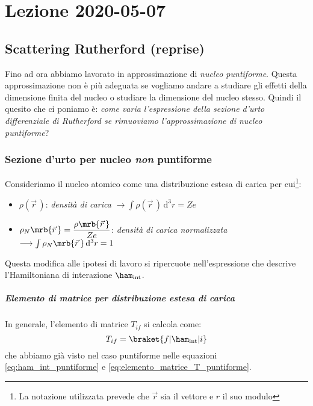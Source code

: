 \chapter{Lezione 2020-05-07}
\section{Scattering Rutherford (reprise)}
Fino ad ora abbiamo lavorato in approssimazione di \textit{nucleo puntiforme}.
Questa approssimazione non è più adeguata se vogliamo andare a studiare gli
effetti della dimensione finita del nucleo o studiare la dimensione del nucleo
stesso. Quindi il quesito che ci poniamo è: \textit{come varia l'espressione
della sezione d'urto differenziale di Rutherford se rimuoviamo
l'approssimazione di nucleo puntiforme}?

\subsection{Sezione d'urto per nucleo \textit{non} puntiforme}
Consideriamo il nucleo atomico come una distribuzione estesa di carica per
cui\footnote{
  La notazione utilizzata prevede che $\vec{r}$ sia il vettore e $r$ il suo
  modulo
}:
\begin{itemize}
  \item $\rho(\vec{r}\,)$: \textit{densità di carica} $\longrightarrow \int
    \rho(\vec{r}\,) \, \mathrm{d}^3r = Ze$
  \item $\rho_N \mrb{\vec{r}\,} = \dfrac{\rho\mrb{\vec{r}\,}}{Ze}$:
    \textit{densità di carica normalizzata} $\longrightarrow \int
    \rho_N\mrb{\vec{r}\,} \, \mathrm{d}^3r = 1$
\end{itemize}
Questa modifica alle ipotesi di lavoro si ripercuote nell'espressione che
descrive l'Hamiltoniana di interazione $\ham_\text{int}$. 

\paragraph{Elemento di matrice per distribuzione estesa di carica}
In generale, l'elemento di matrice $T_{if}$ si calcola come:
\begin{equation}
	T_{if} = \braket{f \vert \ham_\text{int} \vert i}
\end{equation}
che abbiamo già visto nel caso puntiforme nelle equazioni
\ref{eq:ham_int_puntiforme} e \ref{eq:elemento_matrice_T_puntiforme}.

